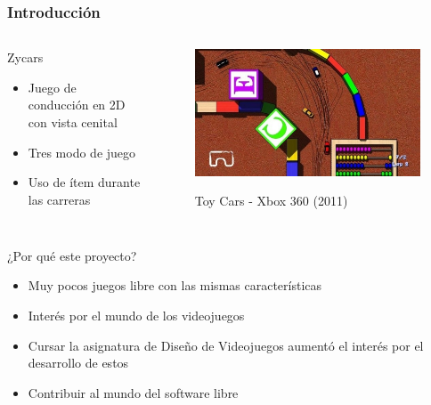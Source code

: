 \begin{frame}
    \frametitle{Introducción}

    \begin{columns}
    
        \column{150px}
        \begin{block}{Zycars}
            \begin{itemize}
                \item Juego de conducción en 2D con vista cenital
                \item Tres modo de juego
                \item Uso de ítem durante las carreras
            \end{itemize}
        \end{block}

        \column{150px}
        \begin{figure}
          \label{logo_latex}
          \begin{center}
            \includegraphics[scale=0.3]{imagenes/toy_cars.jpg}
          \end{center}
          Toy Cars - Xbox 360 (2011)
        \end{figure}
        
    \end{columns}


    \begin{block}{¿Por qué este proyecto?}
        \begin{itemize}
            \item Muy pocos juegos libre con las mismas características
            \item Interés por el mundo de los videojuegos
            \item Cursar la asignatura de Diseño de Videojuegos aumentó el interés por el desarrollo de estos
            \item Contribuir al mundo del software libre
        \end{itemize}
    \end{block}

\end{frame}

